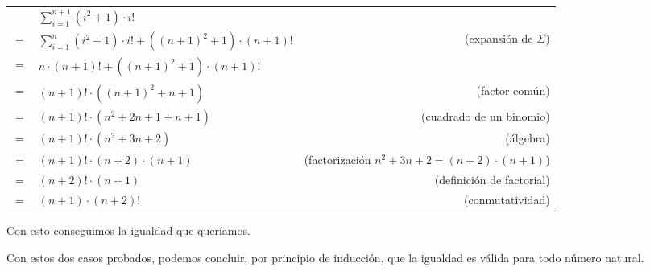 \begin{enumerate}[(a)]
\begin{itemize}
              \begin{tabular}{|l l r}
                 & $\sum_{i=1}^{n+1} (i^2 + 1) \cdot i!$ & \\
                $=$ & $\sum_{i=1}^{n} (i^2 + 1) \cdot i! + ({(n+1)}^2 + 1) \cdot (n+1)!$ & (expansión de $\Sigma$) \\
                $=$ & $n \cdot (n+1)! + ({(n+1)}^2 + 1) \cdot (n+1)!$ & \\
                $=$ & $(n + 1)! \cdot ({(n+1)}^2 + n + 1)$ & (factor común) \\
                $=$ & $(n+1)! \cdot (n^2 + 2n + 1 + n + 1)$ & (cuadrado de un binomio) \\
                $=$ & $(n+1)! \cdot (n^2 + 3n + 2)$ & (álgebra) \\
                $=$ & $(n+1)! \cdot (n + 2) \cdot (n + 1)$ & (factorización $n^2 + 3n + 2 = (n + 2) \cdot (n + 1)$) \\
                $=$ & $(n+2)! \cdot (n + 1)$ & (definición de factorial) \\
                $=$ & $(n+1) \cdot (n+2)!$ & (conmutatividad) \\
              \end{tabular}

              Con esto conseguimos la igualdad que queríamos.
    \end{itemize}

        Con estos dos casos probados, podemos concluir, por principio de inducción, que la igualdad es válida para todo número natural.
\end{enumerate}
